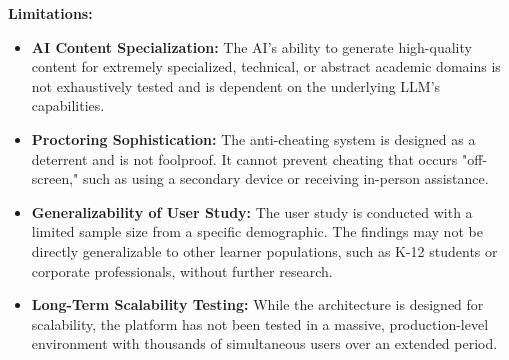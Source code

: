 \textbf{Limitations:}
\begin{itemize}
    \item \textbf{AI Content Specialization:} The AI's ability to generate high-quality content for extremely specialized, technical, or abstract academic domains is not exhaustively tested and is dependent on the underlying LLM's capabilities.
    \item \textbf{Proctoring Sophistication:} The anti-cheating system is designed as a deterrent and is not foolproof. It cannot prevent cheating that occurs "off-screen," such as using a secondary device or receiving in-person assistance.
    \item \textbf{Generalizability of User Study:} The user study is conducted with a limited sample size from a specific demographic. The findings may not be directly generalizable to other learner populations, such as K-12 students or corporate professionals, without further research.
    \item \textbf{Long-Term Scalability Testing:} While the architecture is designed for scalability, the platform has not been tested in a massive, production-level environment with thousands of simultaneous users over an extended period.
\end{itemize}

